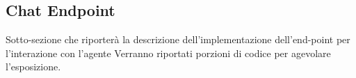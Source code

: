 \subsection{Chat Endpoint}

Sotto-sezione che riporterà la descrizione dell'implementazione dell'end-point per l'interazione con l'agente
Verranno riportati porzioni di codice per agevolare l'esposizione.
